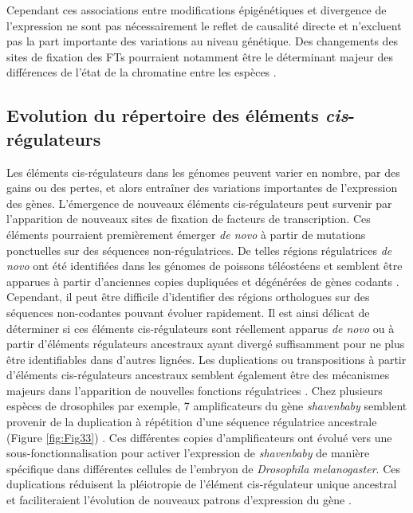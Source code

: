 Cependant ces associations entre modifications épigénétiques et divergence de l’expression ne sont pas nécessairement le reflet de causalité directe et n’excluent pas la part importante des variations au niveau génétique. Des changements des sites de fixation des \acrshort{FT}s pourraient notamment être le déterminant majeur des différences de l’état de la chromatine entre les espèces \citep{mcvicker_identification_2013}.

\subsection{Evolution du répertoire des éléments \textit{cis}-régulateurs}
\label{subsec:evol-repertoire}

Les éléments \gls{cis}-régulateurs dans les génomes peuvent varier en nombre, par des gains ou des pertes, et alors entraîner des variations importantes de l’expression des gènes. L’émergence de nouveaux éléments \gls{cis}-régulateurs peut survenir par l’apparition de nouveaux sites de fixation de facteurs de transcription. Ces éléments pourraient premièrement émerger \textit{de novo} à partir de mutations ponctuelles sur des séquences non-régulatrices. De telles régions régulatrices \textit{de novo} ont été identifiées dans les génomes de poissons téléostéens et semblent être apparues à partir d’anciennes copies dupliquées et dégénérées de gènes codants \citep{eichenlaub_novo_2011}. Cependant, il peut être difficile d’identifier des régions orthologues sur des séquences non-codantes pouvant évoluer rapidement. Il est ainsi délicat de déterminer si ces éléments \gls{cis}-régulateurs sont réellement apparus \textit{de novo} ou à partir d'éléments régulateurs ancestraux ayant divergé suffisamment pour ne plus être identifiables dans d’autres lignées. Les duplications ou transpositions à partir d’éléments \gls{cis}-régulateurs ancestraux semblent également être des mécanismes majeurs dans l’apparition de nouvelles fonctions régulatrices \citep{rebeiz_enhancer_2018}. Chez plusieurs espèces de drosophiles par exemple, 7 \glspl{amplificateur} du gène \textit{shavenbaby} semblent provenir de la duplication à répétition d'une séquence régulatrice ancestrale (Figure \ref{fig:Fig33}) \citep{kittelmann_complex_2021}. Ces différentes copies d’\glspl{amplificateur} ont évolué vers une sous-fonctionnalisation pour activer l’expression de \textit{shavenbaby} de manière spécifique dans différentes cellules de l’embryon de \textit{Drosophila melanogaster}. Ces duplications réduisent la pléiotropie de l’élément \gls{cis}-régulateur unique ancestral et faciliteraient l’évolution de nouveaux patrons d’expression du gène \citep{murugesan_evolution_2022}. \\

